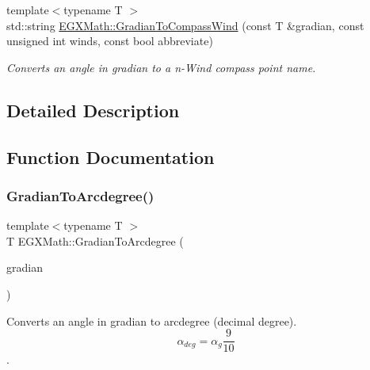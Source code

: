 \begin{DoxyCompactItemize}
{\footnotesize template$<$typename T $>$ }\\std\+::string \mbox{\hyperlink{group___e_g_x_math-_conversions-_angle_conversions-_gradian_ga52ed2e44217e6a57e56829bee36612dc}{E\+G\+X\+Math\+::\+Gradian\+To\+Compass\+Wind}} (const T \&gradian, const unsigned int winds, const bool abbreviate)
\begin{DoxyCompactList}\small\item\em Converts an angle in gradian to a n-\/\+Wind compass point name. \end{DoxyCompactList}\end{DoxyCompactItemize}


\subsection{Detailed Description}


\subsection{Function Documentation}
\mbox{\label{group___e_g_x_math-_conversions-_angle_conversions-_gradian_gacd0b1797f2460944dcbc541a855ec21c}} 
\subsubsection{\texorpdfstring{Gradian\+To\+Arcdegree()}{GradianToArcdegree()}}
{\footnotesize\ttfamily template$<$typename T $>$ \\
T E\+G\+X\+Math\+::\+Gradian\+To\+Arcdegree (\begin{DoxyParamCaption}\item[{const T \&}]{gradian }\end{DoxyParamCaption})}



Converts an angle in gradian to arcdegree (decimal degree). \[\alpha_{deg}=\alpha_{g}\frac{9}{10}\]. 


